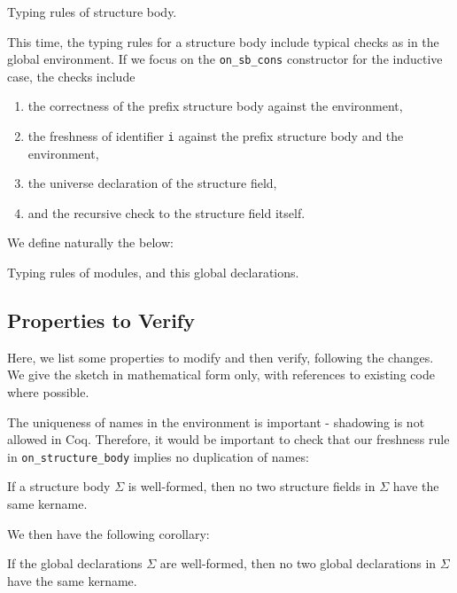 \begin{listing}[H]
  \caption{Typing rules of structure body.}
  \label{lst:2-typing-sb}
\end{listing}

This time, the typing rules for a structure body include typical checks as in
the global environment. If we focus on the \verb|on_sb_cons| constructor for the
inductive case, the checks include
\begin{enumerate}
  \item the correctness of the prefix structure body against the environment,
  \item the freshness of identifier \verb|i| against the prefix structure body
  and the environment,
  \item the universe declaration of the structure field,
  \item and the recursive check to the structure field itself.
\end{enumerate} 

We define naturally the below:

\begin{listing}[H]
  \caption{Typing rules of modules, and this global declarations.}
  \label{lst:2-typing-mod}
\end{listing}

\subsection*{Properties to Verify}

Here, we list some properties to modify and then verify, following the changes.
We give the sketch in mathematical form only, with references to existing code
where possible.

The uniqueness of names in the environment is important - shadowing is not
allowed in Coq. Therefore, it would be important to check that our freshness
rule in \verb|on_structure_body| implies no duplication of names:

\begin{lemma}
  If a structure body $\Sigma$ is well-formed, then no two structure fields in
  $\Sigma$ have the same kername.
\end{lemma}

We then have the following corollary:

\begin{corollary}
  If the global declarations $\Sigma$ are well-formed, then no two global
  declarations in $\Sigma$ have the same kername.
\end{corollary}

